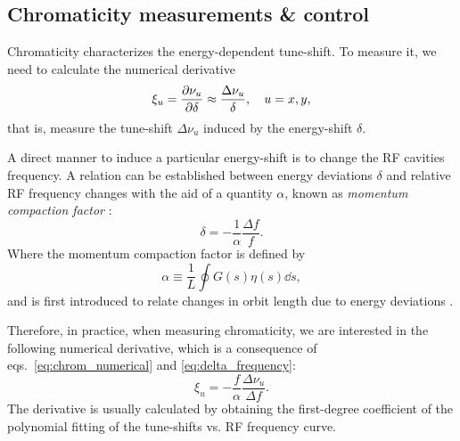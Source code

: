 \subsection{Chromaticity measurements \& control}
Chromaticity characterizes the energy-dependent tune-shift. To measure it, we need to calculate the numerical derivative
\begin{equation}
    \xi_u = \pdv{\nu_u}{\delta}\approx \frac{\Delta \nu_u}{\delta}, \quad u=x, y,
    \label{eq:chrom_numerical}
\end{equation}
that is, measure the tune-shift $\Delta \nu_u$ induced by the energy-shift $\delta$.

A direct manner to induce a particular energy-shift is to change the RF cavities frequency. A relation can be established between energy deviations $\delta$ and relative RF frequency changes with the aid of a quantity $\alpha$, known as \textit{momentum compaction factor} \cite{lee_accelerator_2004,sands_physics_1969}:
\begin{equation}
    \delta = -\frac{1}{\alpha}\frac{\Delta f}{f}.
    \label{eq:delta_frequency}
\end{equation}
Where the momentum compaction factor is defined by
\begin{equation}
    \alpha \equiv \frac{1}{L}\oint G(s) \eta(s) \dd{s},
\end{equation}
and is first introduced to relate changes in orbit length due to energy deviations \cite{sands_physics_1969}.

Therefore, in practice, when measuring chromaticity, we are interested in the following numerical derivative, which is a consequence of eqs.~\eqref{eq:chrom_numerical} and \eqref{eq:delta_frequency}:
\begin{equation}
\xi_u = -\frac{f}{\alpha}\frac{\Delta \nu_u}{\Delta f}.
\end{equation}
The derivative is usually calculated by obtaining the first-degree coefficient of the polynomial fitting of the tune-shifts vs. RF frequency curve.

